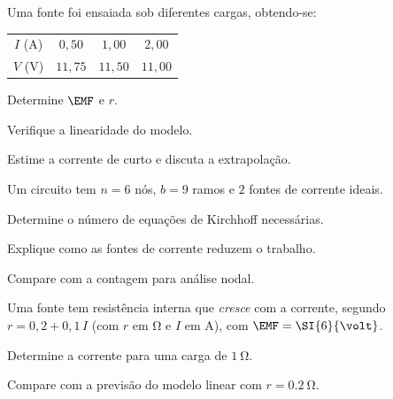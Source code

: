 \begin{questao}[3]{}

Uma fonte foi ensaiada sob diferentes cargas, obtendo-se:
\begin{center}
\begin{tabular}{cccc}
\hline
$I$ ($\si{\ampere}$) & $0{,}50$ & $1{,}00$ & $2{,}00$\\
$V$ ($\si{\volt}$) & $11{,}75$ & $11{,}50$ & $11{,}00$\\
\hline
\end{tabular}
\end{center}
\begin{itensq}
\item Determine $\EMF$ e $r$.
\item Verifique a linearidade do modelo.
\item Estime a corrente de curto e discuta a extrapolação.
\end{itensq}


\end{questao}
\begin{questao}[3]{}

Um circuito tem $n=6$ nós, $b=9$ ramos e $2$ fontes de corrente ideais.
\begin{itensq}
\item Determine o número de equações de Kirchhoff necessárias.
\item Explique como as fontes de corrente reduzem o trabalho.
\item Compare com a contagem para análise nodal.
\end{itensq}


\end{questao}
\begin{questao}[3]{}

Uma fonte tem resistência interna que \emph{cresce} com a corrente, segundo
$r=0{,}2+0{,}1\,I$ (com $r$ em $\si{\ohm}$ e $I$ em $\si{\ampere}$), com
$\EMF=\SI{6}{\volt}$.
\begin{itensq}
\item Determine a corrente para uma carga de $\SI{1}{\ohm}$.
\item Compare com a previsão do modelo linear com $r=\SI{0.2}{\ohm}$.
\end{itensq}


\end{questao}
